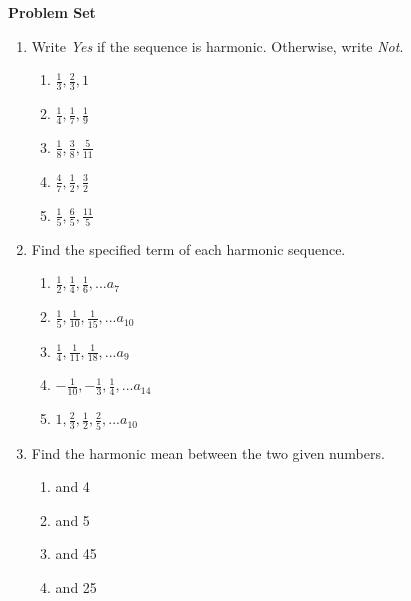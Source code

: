 \textbf{Problem Set}

\vspce
\begin{enumerate}[label = \Alph*. ]

\item Write \emph{Yes} if the sequence is harmonic. Otherwise, write \emph{Not}. 


\begin{enumerate}[label = \arabic*. ]

\item \hspce $\displaystyle \frac{1}{3}, \frac{2}{3}, 1$ 
\vspce
\item \hspce $\displaystyle \frac{1}{4}, \frac{1}{7}, \frac{1}{9}$ 
\vspce
\item \hspce $\displaystyle \frac{1}{8}, \frac{3}{8}, \frac{5}{11}$
\vspce
\item \hspce $\displaystyle \frac{4}{7}, \frac{1}{2}, \frac{3}{2}$
\vspce
\item \hspce $\displaystyle \frac{1}{5}, \frac{6}{5}, \frac{11}{5}$ 


\end{enumerate}

\item Find the specified term of each harmonic sequence. 
\begin{enumerate}[label = \arabic*. ]

\item \hspce $\displaystyle \frac{1}{2}, \frac{1}{4}, \frac{1}{6},... a_7$ 
\vspce
\item \hspce $\displaystyle \frac{1}{5}, \frac{1}{10}, \frac{1}{15},... a_{10}$ 
\vspce
\item \hspce $\displaystyle \frac{1}{4}, \frac{1}{11}, \frac{1}{18},... a_9$
\vspce
\item \hspce $\displaystyle -\frac{1}{10}, -\frac{1}{3}, \frac{1}{4},... a_{14}$
\vspce
\item \hspce $\displaystyle 1, \frac{2}{3}, \frac{1}{2}, \frac{2}{5},... a_{10}$ 

\end{enumerate}


\item Find the harmonic mean between the two given numbers. 
\begin{enumerate}[label = \arabic*. ]

\item {} and 4 
\vspce
\item {} and 5
\vspce
\item {} and 45
\vspce
\item {} and 25
\vspce


\end{enumerate}


\end{enumerate}